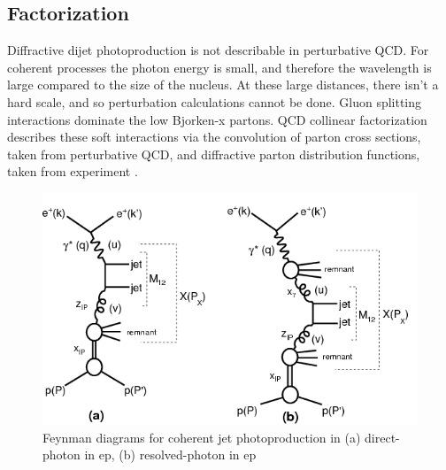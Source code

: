 \subsection{Factorization}

Diffractive dijet photoproduction is not describable in perturbative QCD. For coherent processes the photon energy is small, and therefore the wavelength is large compared to the size of the nucleus. At these large distances, there isn't a hard scale, and so perturbation calculations cannot be done. Gluon splitting interactions dominate the low Bjorken-x partons. QCD collinear factorization describes these soft interactions via the convolution of parton cross sections, taken from perturbative QCD, and diffractive parton distribution functions, taken from experiment \cite{Andreev:2015cwa}. 

\begin{figure}[h!]
\begin{centering}
\includegraphics[width=6in]{Chapter1/importfigs/h1_2015_feyn.png}
\par\end{centering}
\caption{Feynman diagrams for coherent jet photoproduction in (a) direct-photon in ep, (b) resolved-photon in ep \cite{Andreev:2015cwa} \label{fig:feynmanUPC1}}
\end{figure}

